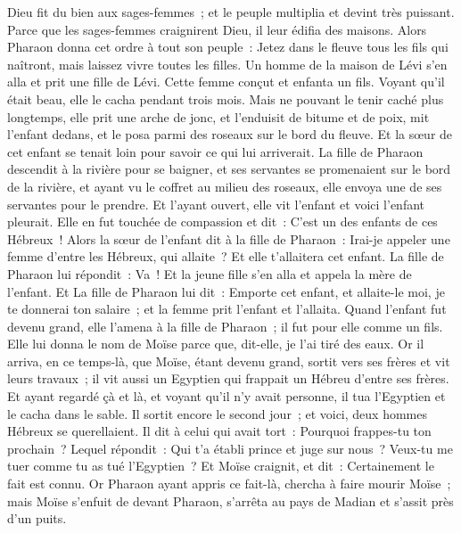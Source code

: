 \begin{multicols}{2}
Dieu fit du bien aux sages-femmes~; et le peuple multiplia et devint très puissant.
Parce que les sages-femmes craignirent Dieu, il leur édifia des maisons.
Alors Pharaon donna cet ordre à tout son peuple~: Jetez dans le fleuve tous les fils qui naîtront, mais laissez vivre toutes les filles.
\VerseOne{}Un homme de la maison de Lévi s'en alla et prit une fille de Lévi.
Cette femme conçut et enfanta un fils. Voyant qu'il était beau, elle le cacha pendant trois mois.
Mais ne pouvant le tenir caché plus longtemps, elle prit une arche de jonc, et l'enduisit de bitume et de poix, mit l'enfant dedans, et le posa parmi des roseaux sur le bord du fleuve.
Et la sœur de cet enfant se tenait loin pour savoir ce qui lui arriverait.
La fille de Pharaon descendit à la rivière pour se baigner, et ses servantes se promenaient sur le bord de la rivière, et ayant vu le coffret au milieu des roseaux, elle envoya une de ses servantes pour le prendre.
Et l'ayant ouvert, elle vit l'enfant et voici l'enfant pleurait. Elle en fut touchée de compassion et dit~: C'est un des enfants de ces Hébreux~!
Alors la sœur de l'enfant dit à la fille de Pharaon~: Irai-je appeler une femme d'entre les Hébreux, qui allaite~? Et elle t'allaitera cet enfant.
La fille de Pharaon lui répondit~: Va~! Et la jeune fille s'en alla et appela la mère de l'enfant.
Et La fille de Pharaon lui dit~: Emporte cet enfant, et allaite-le moi, je te donnerai ton salaire~; et la femme prit l'enfant et l'allaita.
Quand l'enfant fut devenu grand, elle l'amena à la fille de Pharaon~; il fut pour elle comme un fils. Elle lui donna le nom de Moïse parce que, dit-elle, je l'ai tiré des eaux.
Or il arriva, en ce temps-là, que Moïse, étant devenu grand, sortit vers ses frères et vit leurs travaux~; il vit aussi un Egyptien qui frappait un Hébreu d'entre ses frères.
Et ayant regardé çà et là, et voyant qu'il n'y avait personne, il tua l'Egyptien et le cacha dans le sable.
Il sortit encore le second jour~; et voici, deux hommes Hébreux se querellaient. Il dit à celui qui avait tort~: Pourquoi frappes-tu ton prochain~?
Lequel répondit~: Qui t'a établi prince et juge sur nous~? Veux-tu me tuer comme tu as tué l'Egyptien~? Et Moïse craignit, et dit~: Certainement le fait est connu.
Or Pharaon ayant appris ce fait-là, chercha à faire mourir Moïse~; mais Moïse s'enfuit de devant Pharaon, s'arrêta au pays de Madian et s'assit près d'un puits.

\end{multicols}
